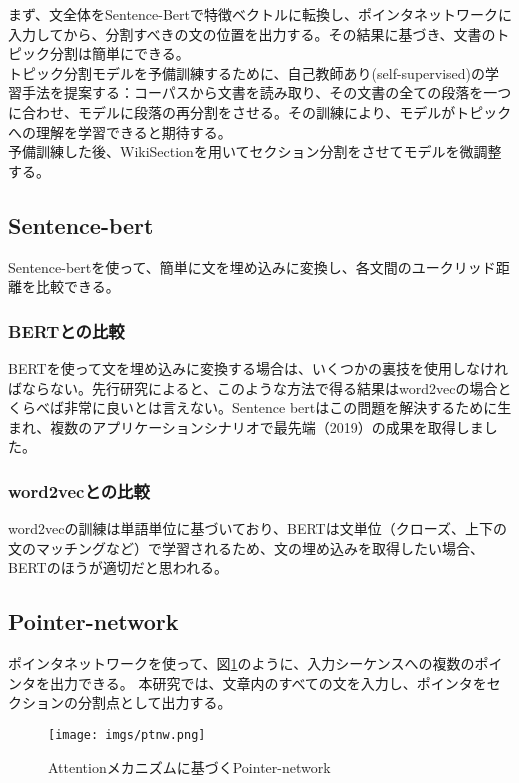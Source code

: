 \documentclass[a4paper]{article}
\begin{document}
まず、文全体をSentence-Bert\cite{reimers2019sentence}で特徴ベクトルに転換し、ポインタネットワーク\cite{vinyals2015pointer}に入力してから、分割すべきの文の位置を出力する。その結果に基づき、文書のトピック分割は簡単にできる。\\

トピック分割モデルを予備訓練するために、自己教師あり(self-supervised)の学習手法を提案する：コーパスから文書を読み取り、その文書の全ての段落を一つに合わせ、モデルに段落の再分割をさせる。その訓練により、モデルがトピックへの理解を学習できると期待する。\\

予備訓練した後、WikiSectionを用いてセクション分割をさせてモデルを微調整する。\\

\subsection{Sentence-bert}

Sentence-bertを使って、簡単に文を埋め込みに変換し、各文間のユークリッド距離を比較できる。

\subsubsection{BERTとの比較}
BERTを使って文を埋め込みに変換する場合は、いくつかの裏技を使用しなければならない。先行研究によると、このような方法で得る結果はword2vecの場合とくらべば非常に良いとは言えない。Sentence bertはこの問題を解決するために生まれ、複数のアプリケーションシナリオで最先端（2019）の成果を取得しました。

\subsubsection{word2vecとの比較}
word2vecの訓練は単語単位に基づいており、BERTは文単位（クローズ、上下の文のマッチングなど）で学習されるため、文の埋め込みを取得したい場合、BERTのほうが適切だと思われる。

\subsection{Pointer-network}
ポインタネットワークを使って、図\ref{fig:img2}のように、入力シーケンスへの複数のポインタを出力できる。 本研究では、文章内のすべての文を入力し、ポインタをセクションの分割点として出力する。

\begin{figure}[H]
  \texttt{[image: imgs/ptnw.png]}
  \caption{Attentionメカニズムに基づくPointer-network}
  \label{fig:img2}
\end{figure}
\end{document}
